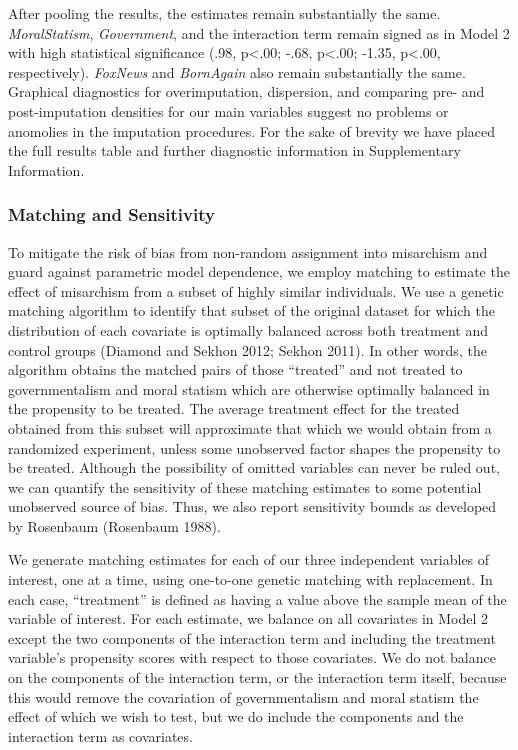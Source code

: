 \documentclass[12pt,]{article}
\begin{document}
After pooling the results, the estimates remain substantially the same.
\emph{MoralStatism}, \emph{Government}, and the interaction term remain
signed as in Model 2 with high statistical significance (.98,
p\textless{}.00; -.68, p\textless{}.00; -1.35, p\textless{}.00,
respectively). \emph{FoxNews} and \emph{BornAgain} also remain
substantially the same. Graphical diagnostics for overimputation,
dispersion, and comparing pre- and post-imputation densities for our
main variables suggest no problems or anomolies in the imputation
procedures. For the sake of brevity we have placed the full results
table and further diagnostic information in Supplementary Information.

\subsubsection{Matching and Sensitivity}\label{matching-and-sensitivity}

To mitigate the risk of bias from non-random assignment into misarchism
and guard against parametric model dependence, we employ matching to
estimate the effect of misarchism from a subset of highly similar
individuals. We use a genetic matching algorithm to identify that subset
of the original dataset for which the distribution of each covariate is
optimally balanced across both treatment and control groups (Diamond and
Sekhon 2012; Sekhon 2011). In other words, the algorithm obtains the
matched pairs of those ``treated'' and not treated to governmentalism
and moral statism which are otherwise optimally balanced in the
propensity to be treated. The average treatment effect for the treated
obtained from this subset will approximate that which we would obtain
from a randomized experiment, unless some unobserved factor shapes the
propensity to be treated. Although the possibility of omitted variables
can never be ruled out, we can quantify the sensitivity of these
matching estimates to some potential unobserved source of bias. Thus, we
also report sensitivity bounds as developed by Rosenbaum (Rosenbaum
1988).

We generate matching estimates for each of our three independent
variables of interest, one at a time, using one-to-one genetic matching
with replacement. In each case, ``treatment'' is defined as having a
value above the sample mean of the variable of interest. For each
estimate, we balance on all covariates in Model 2 except the two
components of the interaction term and including the treatment
variable's propensity scores with respect to those covariates. We do not
balance on the components of the interaction term, or the interaction
term itself, because this would remove the covariation of
governmentalism and moral statism the effect of which we wish to test,
but we do include the components and the interaction term as covariates.
\end{document}
